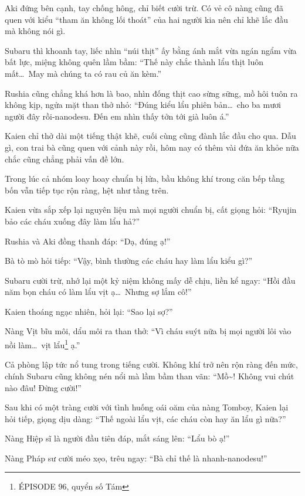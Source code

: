 \documentclass[../main.tex]{subfiles}
\begin{document}
Aki đứng bên cạnh, tay chống hông, chỉ biết cười trừ. Có vẻ cô nàng cũng đã quen với kiểu ``tham ăn không lối thoát'' của hai người kia nên chỉ khẽ lắc đầu mà không nói gì.

Subaru thì khoanh tay, liếc nhìn ``núi thịt'' ấy bằng ánh mắt vừa ngán ngẩm vừa bất lực, miệng không quên lầm bầm: ``Thế này chắc thành lẩu thịt luôn mất\dots\ May mà chúng ta có rau củ ăn kèm.''

Rushia cũng chẳng khá hơn là bao, nhìn đống thịt cao sừng sững, mồ hôi tuôn ra không kịp, ngửa mặt than thở nhỏ: ``Đúng kiểu lẩu phiên bản\dots\ cho ba mươi người đây rồi-nanodesu. Đến em nhìn thấy tởn tới già luôn á.''

Kaien chỉ thở dài một tiếng thật khẽ, cuối cùng cũng đành lắc đầu cho qua. Dẫu gì, con trai bà cũng quen với cảnh này rồi, hôm nay có thêm vài đứa ăn khỏe nữa chắc cũng chẳng phải vấn đề lớn.

\ct

Trong lúc cả nhóm loay hoay chuẩn bị lửa, bầu không khí trong căn bếp tầng bốn vẫn tiếp tục rộn ràng, hệt như tầng trên.

Kaien vừa sắp xếp lại nguyên liệu mà mọi người chuẩn bị, cất giọng hỏi: ``Ryujin bảo các cháu xuống đây làm lẩu hả?''

Rushia và Aki đồng thanh đáp: ``Dạ, đúng ạ!''

Bà tò mò hỏi tiếp: ``Vậy, bình thường các cháu hay làm lẩu kiểu gì?''

Subaru cười trừ, nhớ lại một kỷ niệm không mấy dễ chịu, liền kể ngay: ``Hồi đầu năm bọn cháu có làm lẩu vịt ạ\dots\ Nhưng sợ lắm cô!''

Kaien thoáng ngạc nhiên, hỏi lại: ``Sao lại sợ?''

Nàng Vịt bĩu môi, dẩu môi ra than thở: ``Vì cháu suýt nữa bị mọi người lôi vào nồi làm\dots\ vịt lẩu\footnote{{\flaregothic ÉPISODE 96}, quyển số Tám} ạ.''

Cả phòng lập tức nổ tung trong tiếng cười. Không khí trở nên rộn ràng đến mức, chính Subaru cũng không nén nổi mà lầm bầm than vãn: ``Mồ\~{}! Không vui chút nào đâu! Đừng cười!''

Sau khi có một tràng cười với tình huống oái oăm của nàng Tomboy, Kaien lại hỏi tiếp, giọng dịu dàng: ``Thế ngoài lẩu vịt, các cháu còn hay ăn lẩu gì nữa?''

Nàng Hiệp sĩ là người đầu tiên đáp, mắt sáng lên: ``Lẩu bò ạ!''

Nàng Pháp sư cười méo xẹo, trêu ngay: ``Bà chỉ thế là nhanh-nanodesu!''
\end{document}
